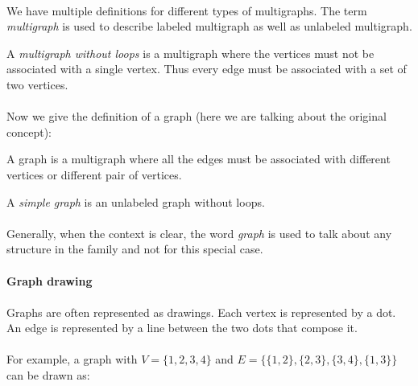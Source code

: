 \paragraph{}
We have multiple definitions for different types of multigraphs. The term \textit{multigraph} is used to describe labeled multigraph as well as unlabeled multigraph.

\begin{definition}
  A \textit{multigraph without loops} is a multigraph where the vertices must not be associated with a single vertex. Thus every edge must be associated with a set of two vertices.
\end{definition}

\paragraph{}
Now we give the definition of a graph (here we are talking about the original concept):

\begin{definition}[Graph]
  A graph is a multigraph where all the edges must be associated with different vertices or different pair of vertices.
\end{definition}

\begin{definition}
  A \textit{simple graph} is an unlabeled graph without loops.
\end{definition}

\paragraph{}
Generally, when the context is clear, the word \textit{graph} is used to talk about any structure in the family and not for this special case.

\paragraph{}
\textbf{Graph drawing}

\paragraph{}
Graphs are often represented as drawings.  Each vertex is represented by a dot. An edge is represented by a line between the two dots that compose it.

\paragraph{}
For example, a graph with $V = \{1,2,3,4\}$ and $E = \{\{1,2\}, \{2,3\}, \{3,4\}, \{1,3\}\}$ can be drawn as:

